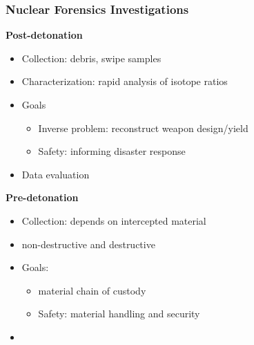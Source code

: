 
\begin{frame}
  \frametitle{Nuclear Forensics Investigations}
  \begin{minipage}[t]{0.5\textwidth}
    \textbf{Post-detonation}
    \begin{itemize}
      \item Collection: debris, swipe samples
      \item Characterization: rapid analysis of isotope ratios
      \item Goals
      \begin{itemize}
        \item Inverse problem: reconstruct weapon design/yield
        \item Safety: informing disaster response
      \end{itemize}
      \item Data evaluation
    \end{itemize}
  \end{minipage}%
  \pause
  \begin{minipage}[t]{0.5\textwidth}
    \textbf{Pre-detonation}
    \begin{itemize}
      \item Collection: depends on intercepted material
      \item {} non-destructive and destructive
      \item Goals:
      \begin{itemize}
        \item {} material chain of custody
        \item Safety: material handling and security
      \end{itemize}
      \item {}
    \end{itemize}
  \end{minipage}
\end{frame}


